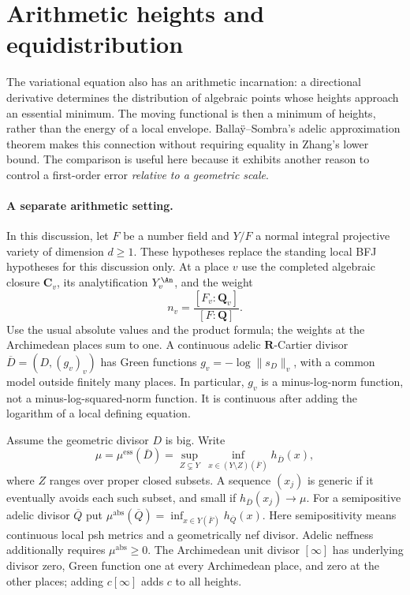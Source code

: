 \section*{Arithmetic heights and equidistribution}

The variational equation also has an arithmetic incarnation: a
directional derivative determines the distribution of algebraic points
whose heights approach an essential minimum. The moving functional is
then a minimum of heights, rather than the energy of a local envelope.
Balla\"y--Sombra's adelic approximation theorem
\cite[Theorems~6.9 and~6.17]{BallaySombra26Published} makes this
connection without requiring equality in Zhang's lower bound.
The comparison is useful here because it exhibits another reason to
control a first-order error \emph{relative to a geometric scale}.

\paragraph{A separate arithmetic setting.}
In this discussion, let $F$ be a number field and $Y/F$ a normal
integral projective variety of dimension $d\geq1$. These hypotheses
replace the standing local BFJ hypotheses for this discussion only.
At a place $v$ use the completed algebraic closure $\mathbf C_v$,
its analytification $Y_v^{\An}$, and the weight
\[
 n_v=\frac{[F_v:\mathbf Q_v]}{[F:\mathbf Q]}.
\]
Use the usual absolute values and the product formula; the weights
at the Archimedean places sum to one.
A continuous adelic $\mathbf R$-Cartier divisor
$\overline D=(D,(g_v)_v)$ has Green functions
$g_v=-\log\|s_D\|_v$, with a common model outside finitely many
places. In particular, $g_v$ is a minus-log-norm function, not a
minus-log-squared-norm function. It is continuous after adding the
logarithm of a local defining equation.

Assume the geometric divisor $D$ is big. Write
\[
 \mu=\mu^{\mathrm{ess}}(\overline D)
   =\sup_{Z\subsetneq Y}\ \inf_{x\in(Y\setminus Z)(\overline F)}
                                      h_{\overline D}(x),
\]
where $Z$ ranges over proper closed subsets. A sequence $(x_j)$ is
generic if it eventually avoids each such subset, and small if
$h_{\overline D}(x_j)\to\mu$.
For a semipositive adelic divisor $\overline Q$ put
$\mu^{\mathrm{abs}}(\overline Q)=\inf_{x\in Y(\overline F)}
h_{\overline Q}(x)$. Here semipositivity means continuous local psh
metrics and a geometrically nef divisor. Adelic neffness additionally
requires $\mu^{\mathrm{abs}}\geq0$.
The Archimedean unit divisor $[\infty]$ has underlying divisor zero,
Green function one at every Archimedean place, and zero at the other
places; adding $c[\infty]$ adds $c$ to all heights.

